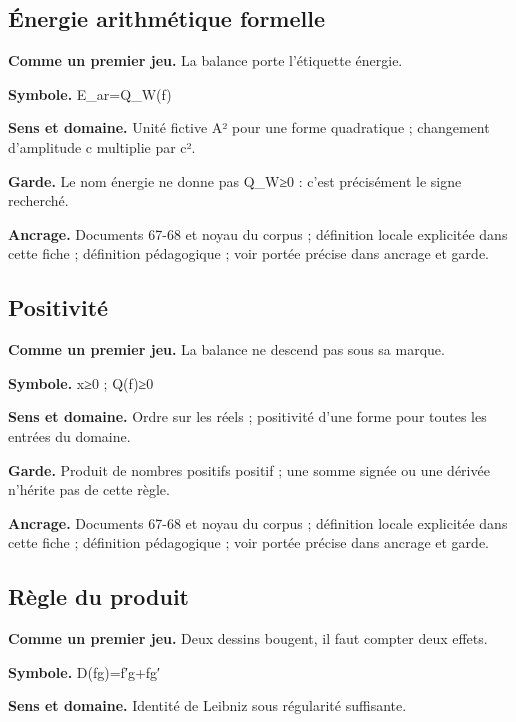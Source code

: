 \documentclass[
  9pt,
  a4paper,
]{article}
\begin{document}
\hypertarget{uxe9nergie-arithmuxe9tique-formelle}{%
\subsection{Énergie arithmétique
formelle}\label{uxe9nergie-arithmuxe9tique-formelle}}

\textbf{Comme un premier jeu.} La balance porte l'étiquette énergie.

\textbf{Symbole.} E\_ar=Q\_W(f)

\textbf{Sens et domaine.} Unité fictive A² pour une forme quadratique ;
changement d'amplitude c multiplie par \textbar c\textbar².

\textbf{Garde.} Le nom énergie ne donne pas Q\_W≥0 : c'est précisément
le signe recherché.

\textbf{Ancrage.} Documents 67-68 et noyau du corpus ; définition locale
explicitée dans cette fiche ; définition pédagogique ; voir portée
précise dans ancrage et garde.

\hypertarget{positivituxe9}{%
\subsection{Positivité}\label{positivituxe9}}

\textbf{Comme un premier jeu.} La balance ne descend pas sous sa marque.

\textbf{Symbole.} x≥0 ; Q(f)≥0

\textbf{Sens et domaine.} Ordre sur les réels ; positivité d'une forme
pour toutes les entrées du domaine.

\textbf{Garde.} Produit de nombres positifs positif ; une somme signée
ou une dérivée n'hérite pas de cette règle.

\textbf{Ancrage.} Documents 67-68 et noyau du corpus ; définition locale
explicitée dans cette fiche ; définition pédagogique ; voir portée
précise dans ancrage et garde.

\hypertarget{ruxe8gle-du-produit}{%
\subsection{Règle du produit}\label{ruxe8gle-du-produit}}

\textbf{Comme un premier jeu.} Deux dessins bougent, il faut compter
deux effets.

\textbf{Symbole.} D(fg)=f′g+fg′

\textbf{Sens et domaine.} Identité de Leibniz sous régularité
suffisante.
\end{document}
